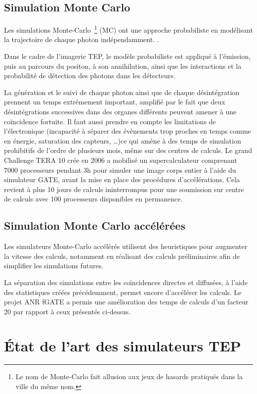 		\subsection{Simulation Monte Carlo}

Les simulations Monte-Carlo~\footnote{Le nom de Monte-Carlo fait allusion aux jeux de hasards pratiqués dans la ville du même nom.} (MC) ont une approche probabiliste en modélisant la trajectoire de chaque photon indépendamment. .

Dans le cadre de l'imagerie TEP, le modèle probabiliste est appliqué à l'émission, puis au parcours du positon, à son annihilation, ainsi que les interactions et la probabilité de détection des photons dans les détecteurs.

La génération et le suivi de chaque photon ainsi que de chaque désintégration prennent un temps extrêmement important, amplifié par le fait que deux désintégrations successives dans des organes différents peuvent amener à une coïncidence fortuite. Il faut aussi prendre en compte les limitations de l'électronique (incapacité à séparer des évènements trop proches en temps comme en énergie, saturation des capteurs, \dots)ce qui amène à des temps de simulation prohibitifs de l'ordre de plusieurs mois, même sur des centres de calculs. Le grand Challenge TERA 10 crée en 2006 a mobilisé un supercalculateur comprenant 7000 processeurs pendant 3h pour simuler une image corps entier à l'aide du simulateur GATE, avant la mise en place des procédures d'accélérations. Cela revient à plus 10 jours de calculs ininterrompus pour une soumission sur centre de calculs avec 100 processeurs disponibles en permanence.

	\subsection{Simulation Monte Carlo accélérées}

Les simulateurs Monte-Carlo accélérés utilisent des heuristiques pour augmenter la vitesse des calculs, notamment en réalisant des calculs préliminaires afin de simplifier les simulations futures. 

La séparation des simulations entre les coïncidences directes et diffusées, à l’aide des statistiques créées précédemment, permet encore d’accélérer les calculs. Le projet ANR fGATE a permis une amélioration des temps de calculs d'un facteur 20 par rapport à ceux présentés ci-dessus.

	\section{\'Etat de l'art des simulateurs TEP}


